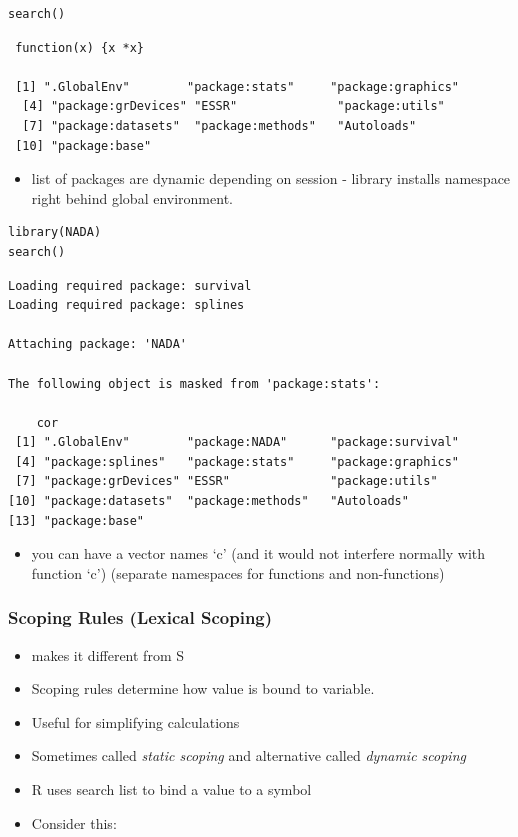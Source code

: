 \documentclass[11pt]{article}
\begin{document}
\begin{verbatim}
search()
\end{verbatim}

\begin{verbatim}
 function(x) {x *x}
  
 [1] ".GlobalEnv"        "package:stats"     "package:graphics" 
  [4] "package:grDevices" "ESSR"              "package:utils"    
  [7] "package:datasets"  "package:methods"   "Autoloads"        
 [10] "package:base"
\end{verbatim}

\begin{itemize}
\item list of packages are dynamic depending on session - library
  installs namespace right behind global environment.
\end{itemize}


\begin{verbatim}
library(NADA)
search()
\end{verbatim}


\begin{verbatim}
Loading required package: survival
Loading required package: splines

Attaching package: 'NADA'

The following object is masked from 'package:stats':

    cor
 [1] ".GlobalEnv"        "package:NADA"      "package:survival" 
 [4] "package:splines"   "package:stats"     "package:graphics" 
 [7] "package:grDevices" "ESSR"              "package:utils"    
[10] "package:datasets"  "package:methods"   "Autoloads"        
[13] "package:base"
\end{verbatim}

\begin{itemize}
\item you can have a vector names `c' (and it would not interfere
  normally with function `c') (separate namespaces for functions and non-functions)
\end{itemize}
\subsubsection{Scoping Rules (Lexical Scoping)}
\label{sec-2-2-5}

\begin{itemize}
\item makes it different from S
\item Scoping rules determine how value is bound to variable.
\item Useful for simplifying calculations
\item Sometimes called \emph{static scoping} and alternative called \emph{dynamic   scoping}
\item R uses search list to bind a value to a symbol
\item Consider this:
\end{itemize}
\end{document}
